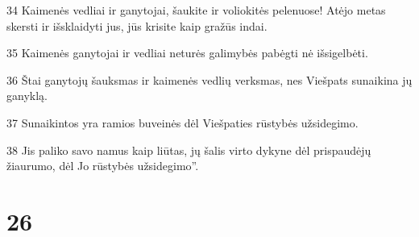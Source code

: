 \par 34 Kaimenės vedliai ir ganytojai, šaukite ir voliokitės pelenuose! Atėjo metas skersti ir išsklaidyti jus, jūs krisite kaip gražūs indai. 
\par 35 Kaimenės ganytojai ir vedliai neturės galimybės pabėgti nė išsigelbėti. 
\par 36 Štai ganytojų šauksmas ir kaimenės vedlių verksmas, nes Viešpats sunaikina jų ganyklą. 
\par 37 Sunaikintos yra ramios buveinės dėl Viešpaties rūstybės užsidegimo. 
\par 38 Jis paliko savo namus kaip liūtas, jų šalis virto dykyne dėl prispaudėjų žiaurumo, dėl Jo rūstybės užsidegimo”.



\chapter{26}


